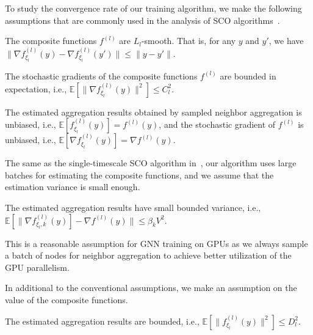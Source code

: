 To study the convergence rate of our training algorithm, 
we make the following assumptions that are commonly used in the analysis of SCO algorithms~\cite{yang2019multilevel, balasubramanian2020stochastic, chen2020solving}. 
\begin{assumption}
  The composite functions $f^{(l)}$ are $L_l$-smooth. That is, for any $y$ and  $y'$, we have $\| \nabla f^{(l)}_{\xi_l}(y)-\nabla f^{(l)}_{\xi_l}(y')\|\leq \|y - y'\|$. 
  \end{assumption}
 \begin{assumption}
    The stochastic gradients of the composite functions $f^{(l)}$ are bounded in expectation, i.e., $\mathbb{E}[\| \nabla f^{(l)}_{\xi_l}(y)\|^2]\le C_l^2$.
 \end{assumption}
 \begin{assumption}
  The estimated aggregation results obtained by sampled neighbor aggregation is unbiased, i.e., $\mathbb{E}[f^{(l)}_{\xi_l}(y)]=f^{(l)}(y)$, and the stochastic gradient of $f^{(l)}$ is unbiased, i.e., $\mathbb{E}[\nabla f^{(l)}_{\xi_l}(y)] = \nabla f^{(l)}(y)$. 
\end{assumption}
The same as the single-timescale SCO algorithm in~\cite{balasubramanian2020stochastic}, our algorithm uses large batches for estimating the composite functions, and we assume that the estimation variance is small enough.  
\begin{assumption}
  The estimated aggregation results have small bounded variance, i.e., $\mathbb{E}[\|\nabla f^{(l)}_{\xi_l, k}(y)] - \nabla f^{(l)}(y)\|\leq \beta_k V^2$. 
\end{assumption}
This is a reasonable assumption for GNN training on GPUs as we always sample a batch of nodes for neighbor aggregation to achieve better utilization of the GPU parallelism. 

In additional to the conventional assumptions, we make an assumption on the value of the composite functions. 
\begin{assumption}
  The estimated aggregation results are bounded, i.e., $\mathbb{E}[\| f^{(l)}_{\xi_l}(y)\|^2]\le D_l^2$.
\end{assumption}


